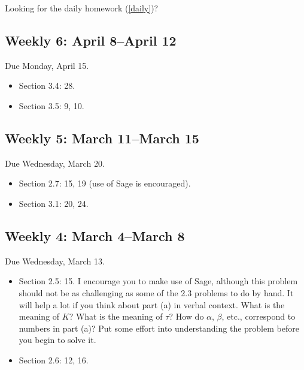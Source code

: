 Looking for the daily homework (\autoref{daily})?

\subsection{Weekly 6: April 8--April 12}
\label{weekly6:april8--april12}

Due Monday, April 15.

\begin{itemize}
\item Section 3.4: 28.

\item Section 3.5: 9, 10.

\end{itemize}

\subsection{Weekly 5: March 11--March 15}
\label{weekly5:march11--march15}

Due Wednesday, March 20.

\begin{itemize}
\item Section 2.7: 15, 19 (use of Sage is encouraged).

\item Section 3.1: 20, 24.

\end{itemize}

\subsection{Weekly 4: March 4--March 8}
\label{weekly4:march4--march8}

Due Wednesday, March 13.

\begin{itemize}
\item Section 2.5: 15. I encourage you to make use of Sage, although this problem should not be as challenging as some of the 2.3 problems to do by hand. It will help a lot if you think about part (a) in verbal context. What is the meaning of $K$? What is the meaning of $\tau$? How do $\alpha$, $\beta$, etc., correspond to numbers in part (a)? Put some effort into understanding the problem before you begin to solve it.

\item Section 2.6: 12, 16.

\end{itemize}

